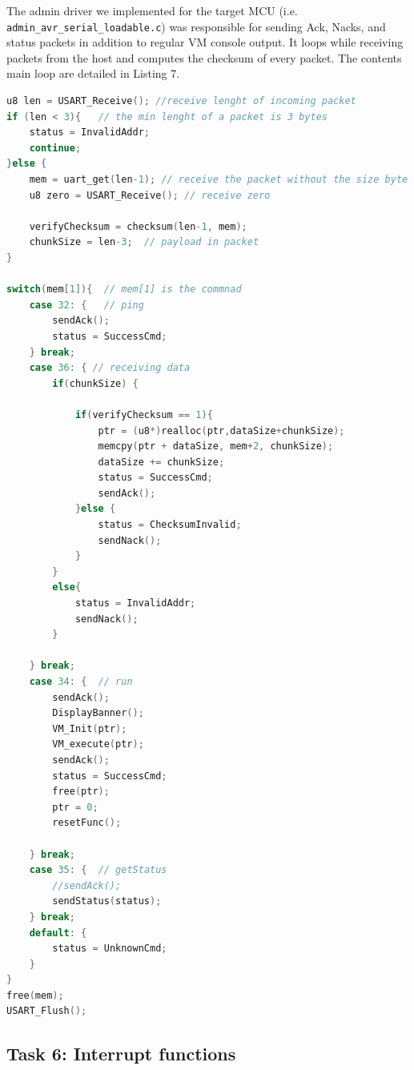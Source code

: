 \documentclass[11pt]{article}
\begin{document}
The admin driver we implemented for the target MCU (i.e. \lstinline[columns=fixed]{admin_avr_serial_loadable.c}) was responsible for sending Ack, Nacks, and status packets in addition to regular VM console output.
It loops while receiving packets from the host and computes the checksum of every packet.
The contents main loop are detailed in Listing 7.

\begin{center}
    \begin{lstlisting}[language=C, columns=fixed, caption=Main loop body of admin\_avr\_serial\_loadable.c]
u8 len = USART_Receive(); //receive lenght of incoming packet
if (len < 3){   // the min lenght of a packet is 3 bytes
    status = InvalidAddr;
    continue;
}else {
    mem = uart_get(len-1); // receive the packet without the size byte because we already got it
    u8 zero = USART_Receive(); // receive zero   

    verifyChecksum = checksum(len-1, mem);
    chunkSize = len-3;  // payload in packet
}

switch(mem[1]){  // mem[1] is the commnad 
    case 32: {   // ping
        sendAck();
        status = SuccessCmd;
    } break;
    case 36: { // receiving data
        if(chunkSize) {

            if(verifyChecksum == 1){
                ptr = (u8*)realloc(ptr,dataSize+chunkSize);
                memcpy(ptr + dataSize, mem+2, chunkSize);
                dataSize += chunkSize;
                status = SuccessCmd;
                sendAck();
            }else {
                status = ChecksumInvalid;
                sendNack();
            }   
        }
        else{
            status = InvalidAddr;
            sendNack();
        }
       
    } break;
    case 34: {  // run
        sendAck();
        DisplayBanner();
        VM_Init(ptr);
        VM_execute(ptr);
        sendAck();
        status = SuccessCmd;
        free(ptr);
        ptr = 0;
        resetFunc();
        
    } break;
    case 35: {  // getStatus
        //sendAck();
        sendStatus(status);
    } break;
    default: {
        status = UnknownCmd;
    }
}
free(mem);
USART_Flush();
    \end{lstlisting}
\end{center}




\subsection{Task 6: Interrupt functions}
\end{document}
